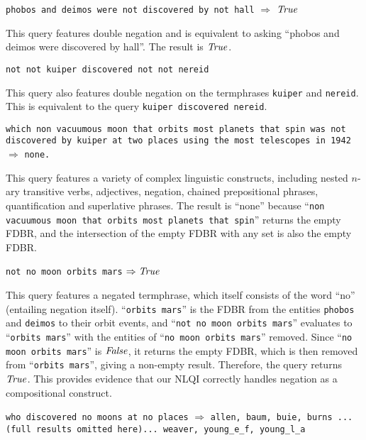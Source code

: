\documentclass[../main.tex]{subfiles}
\begin{document}
\begin{refsection}
\examplespacing

\texttt{phobos and deimos were not discovered by not hall} $\Rightarrow$ $\operatorname{\mathit{True}}$

\examplespacing

\noindent This query features double negation and is equivalent to asking ``phobos and deimos were discovered by hall''.  The result is $\operatorname{\mathit{True}}$.

\examplespacing

\texttt{not not kuiper discovered not not nereid}

\examplespacing

\noindent This query also features double negation on the termphrases \texttt{kuiper} and \texttt{nereid}.
This is equivalent to the query \texttt{kuiper discovered nereid}.

\examplespacing

\texttt{which non vacuumous moon that orbits most planets that spin was not discovered by kuiper at two places using the most telescopes in 1942} $\Rightarrow$ \texttt{none.}

\examplespacing

\noindent This query features a variety of complex linguistic constructs, including nested $n$-ary transitive verbs, adjectives, negation, chained prepositional phrases, quantification and superlative phrases.  The result is ``none'' because ``\texttt{non vacuumous moon that orbits most planets that spin}'' returns the empty FDBR, and the intersection of the empty FDBR with any set is also the empty FDBR.

\examplespacing

\texttt{not no moon orbits mars} $\Rightarrow \operatorname{\mathit{True}}$

\examplespacing

\noindent This query features a negated termphrase, which itself consists of the word ``no'' (entailing negation itself). ``\texttt{orbits mars}'' is the FDBR from the entities \texttt{phobos} and \texttt{deimos} to their orbit events, and ``\texttt{not no moon orbits mars}'' evaluates to ``\texttt{orbits mars}'' with the entities of ``\texttt{no moon orbits mars}'' removed.  Since ``\texttt{no moon orbits mars}'' is $\operatorname{\mathit{False}}$, it returns the empty FDBR, which is then removed from ``\texttt{orbits mars}'', giving a non-empty result.  Therefore, the query returns $\operatorname{\mathit{True}}$. This provides evidence that our NLQI correctly handles negation as a compositional construct.

\examplespacing

\texttt{who discovered no moons at no places} $\Rightarrow$ \texttt{allen, baum, buie, burns ...(full results omitted here)... weaver, young\_e\_f, young\_l\_a}


\end{refsection}
\end{document}
